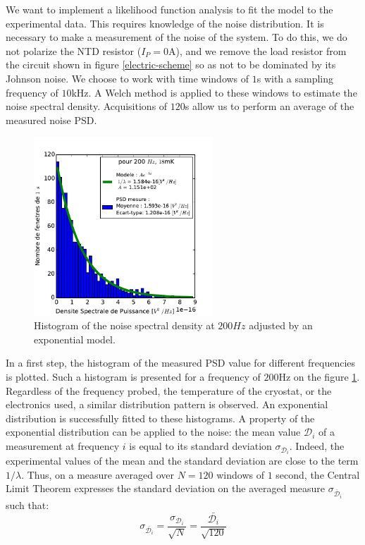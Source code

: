 We want to implement a likelihood function analysis to fit the model to the experimental data. This requires knowledge of the noise distribution. It is necessary to make a measurement of the noise of the system. To do this, we do not polarize the NTD resistor ($I_P=0$A), and we remove the load resistor from the circuit shown in figure \ref{electric-scheme} so as not to be dominated by its Johnson noise. We choose to work with time windows of $1$s with a sampling frequency of $10$kHz. A Welch method is applied to these windows to estimate the noise spectral density. Acquisitions of $120$s allow us to perform an average of the measured noise PSD.

\begin{figure}[!ht]
\begin{center}
\includegraphics[width=0.6\textwidth]{Images/fit_exp_fin.pdf}
\end{center}
\caption{Histogram of the noise spectral density at $200 Hz$ adjusted by an exponential model.}
\label{noise-form}
\end{figure}

In a first step, the histogram of the measured PSD value for different frequencies is plotted. Such a histogram is presented for a frequency of $200$Hz on the figure \ref{noise-form}. Regardless of the frequency probed, the temperature of the cryostat, or the electronics used, a similar distribution pattern is observed. An exponential distribution is successfully fitted to these histograms. A property of the exponential distribution can be applied to the noise: the mean value $\mathcal{D}_i$ of a measurement at frequency $i$ is equal to its standard deviation $\sigma_{\mathcal{D}_i}$. Indeed, the experimental values of the mean and the standard deviation are close to the term $1/\lambda$.
Thus, on a measure averaged over $N=120$ windows of $1$ second, the Central Limit Theorem expresses the standard deviation on the averaged measure $\sigma_{\bar{\mathcal{D}}_i}$ such that:
\begin{equation}
\label{sigma}
\sigma_{\bar{\mathcal{D}_i}} = \frac{\sigma_{\mathcal{D}_i}}{\sqrt{N}} = \frac{\bar{\mathcal{D}_i}}{\sqrt{120}}
\end{equation}

